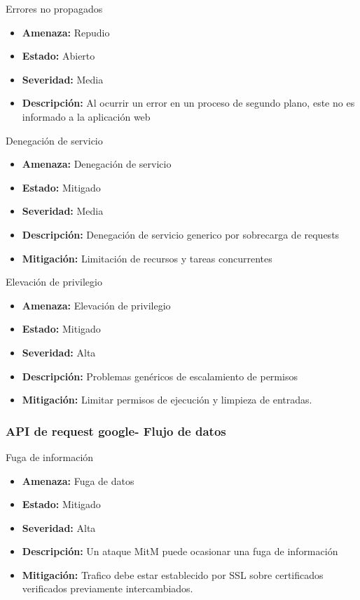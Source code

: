 Errores no propagados
\begin{itemize}
    \item \textbf{Amenaza: } Repudio
    \item \textbf{Estado: } Abierto
    \item \textbf{Severidad: } Media
    \item \textbf{Descripción: } Al ocurrir un error en un proceso de segundo plano, este no es informado a la aplicación web
\end{itemize}

Denegación de servicio
\begin{itemize}
    \item \textbf{Amenaza: } Denegación de servicio
    \item \textbf{Estado: } Mitigado
    \item \textbf{Severidad: } Media
    \item \textbf{Descripción: } Denegación de servicio generico por sobrecarga de requests
    \item \textbf{Mitigación: } Limitación de recursos y tareas concurrentes
\end{itemize}

Elevación de privilegio
\begin{itemize}
    \item \textbf{Amenaza: } Elevación de privilegio
    \item \textbf{Estado: } Mitigado
    \item \textbf{Severidad: } Alta
    \item \textbf{Descripción: } Problemas genéricos de escalamiento de permisos
    \item \textbf{Mitigación: } Limitar permisos de ejecución y limpieza de entradas.
\end{itemize}


\subsubsection{API de request google- Flujo de datos}
Fuga de información
\begin{itemize}
    \item \textbf{Amenaza: } Fuga de datos
    \item \textbf{Estado: } Mitigado
    \item \textbf{Severidad: } Alta
    \item \textbf{Descripción: } Un ataque MitM puede ocasionar una fuga de información
    \item \textbf{Mitigación: } Trafico debe estar establecido por SSL sobre certificados verificados previamente intercambiados.
\end{itemize}

